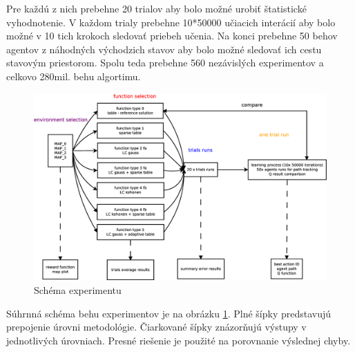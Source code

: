 Pre každú z nich prebehne 20 trialov aby bolo možné urobiť štatistické vyhodnotenie.
V každom trialy prebehne 10*50000 učiacich interácií aby bolo možné v 10 tich krokoch sledovať
priebeh učenia. Na konci prebehne 50 behov agentov z náhodných východzich stavov aby bolo
možné sledovať ich cestu stavovým priestorom. Spolu teda prebehne 560 nezávislých experimentov
a celkovo 280mil. behu algortimu.

\begin{figure}[!htb]
\center
\includegraphics[scale=.3]{../diagrams/experiment_map_q_learning.eps}
\caption{Schéma experimentu}
\label{img:experiment_schem}
\end{figure}

Súhrnná schéma behu experimentov je na obrázku \ref{img:experiment_schem}.
Plné šípky predstavujú prepojenie úrovni metodológie. Čiarkované šípky znázorňujú
výstupy v jednotlivých úrovniach. Presné riešenie je použité na porovnanie výslednej chyby.



